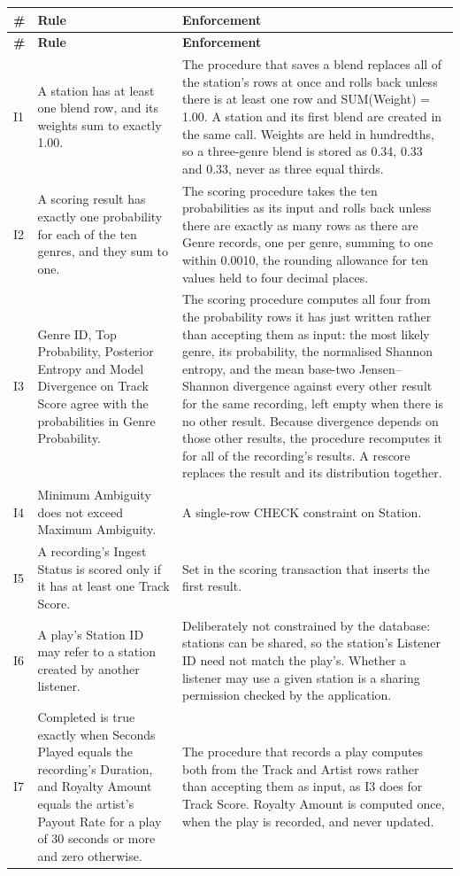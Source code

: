 \documentclass[11pt]{article}
\begin{document}
\begin{longtable}{|L{0.35in}|L{2.55in}|L{3.30in}|}
\hline
{}\textbf{\#} & \textbf{Rule} & \textbf{Enforcement} \\ \hline
\endfirsthead
\hline
{}\textbf{\#} & \textbf{Rule} & \textbf{Enforcement} \\ \hline
\endhead
I1 & A station has at least one blend row, and its weights sum to exactly 1.00. & The procedure that saves a blend replaces all of the station's rows at once and rolls back unless there is at least one row and SUM(Weight) = 1.00. A station and its first blend are created in the same call. Weights are held in hundredths, so a three-genre blend is stored as 0.34, 0.33 and 0.33, never as three equal thirds. \\ \hline
I2 & A scoring result has exactly one probability for each of the ten genres, and they sum to one. & The scoring procedure takes the ten probabilities as its input and rolls back unless there are exactly as many rows as there are Genre records, one per genre, summing to one within 0.0010, the rounding allowance for ten values held to four decimal places. \\ \hline
I3 & Genre ID, Top Probability, Posterior Entropy and Model Divergence on Track Score agree with the probabilities in Genre Probability. & The scoring procedure computes all four from the probability rows it has just written rather than accepting them as input: the most likely genre, its probability, the normalised Shannon entropy, and the mean base-two Jensen--Shannon divergence against every other result for the same recording, left empty when there is no other result. Because divergence depends on those other results, the procedure recomputes it for all of the recording's results. A rescore replaces the result and its distribution together. \\ \hline
I4 & Minimum Ambiguity does not exceed Maximum Ambiguity. & A single-row CHECK constraint on Station. \\ \hline
I5 & A recording's Ingest Status is scored only if it has at least one Track Score. & Set in the scoring transaction that inserts the first result. \\ \hline
I6 & A play's Station ID may refer to a station created by another listener. & Deliberately not constrained by the database: stations can be shared, so the station's Listener ID need not match the play's. Whether a listener may use a given station is a sharing permission checked by the application. \\ \hline
I7 & Completed is true exactly when Seconds Played equals the recording's Duration, and Royalty Amount equals the artist's Payout Rate for a play of 30 seconds or more and zero otherwise. & The procedure that records a play computes both from the Track and Artist rows rather than accepting them as input, as I3 does for Track Score. Royalty Amount is computed once, when the play is recorded, and never updated. \\ \hline
\end{longtable}
\end{document}
